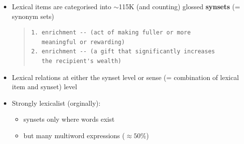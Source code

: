 \documentclass[a4paper,landscape,headrule,footrule,xetex]{foils}
\begin{document}
\begin{itemize}
\item Lexical items are categorised into $\sim$115K (and counting) glossed \textbf{synsets} (= synonym sets)

  \begin{quote}\smaller[2]
\begin{verbatim}
1. enrichment -- (act of making fuller or more 
   meaningful or rewarding)
2. enrichment -- (a gift that significantly increases 
   the recipient's wealth)
\end{verbatim}
  \end{quote}
\item Lexical relations at either the synset level or sense (=
  combination of lexical item and synset) level 
\item Strongly lexicalist (orginally):
  \begin{itemize}
  \item synsets only where words exist
  \item but many multiword expressions ($\approx 50\%$)
  \end{itemize}


\end{itemize}






\MyLogo{}
\end{document}
